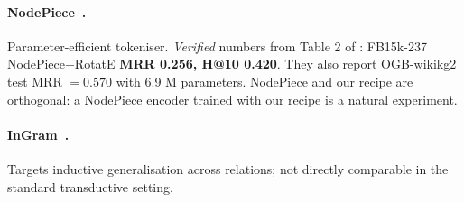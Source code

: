 \paragraph{NodePiece~\citep{nodepiece2022}.}
Parameter-efficient tokeniser. \emph{Verified} numbers from Table 2 of \citep{nodepiece2022}: FB15k-237 NodePiece+RotatE \textbf{MRR 0.256, H@10 0.420}. They also report OGB-wikikg2 test MRR $= 0.570$ with 6.9 M parameters. NodePiece and our recipe are orthogonal: a NodePiece encoder trained with our recipe is a natural experiment.

\paragraph{InGram~\citep{ingram2024}.}
Targets inductive generalisation across relations; not directly comparable in the standard transductive setting.

\begin{table}[!htbp]
\centering
\caption{Recent KG-completion baselines. KG-ICL cells are our \emph{verified reproductions} using the authors' released \texttt{KG-ICL-6L} checkpoint with default inference arguments (MSG=concat, hidden\_dim=32, attn\_dim=5, shot=5). ULTRA reproduction remains unverified on our server because the released stack did not complete preprocessing / extension setup; we report the paper's aggregate number and leave per-dataset cells unverified. ``n.v.'': not verified; ``---'': not reported / n.a. For ULTRA, $\star$ marks datasets inside its pretraining mixture (not true zero-shot).}
\label{tab:modern}
\footnotesize
\setlength{\tabcolsep}{3pt}
\end{table}


